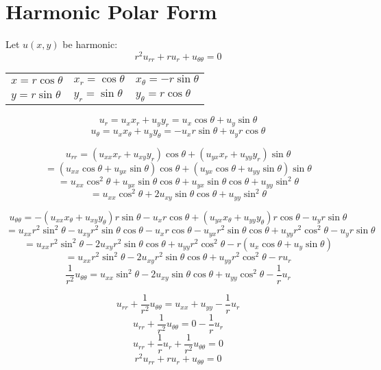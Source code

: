 \documentclass[letterpaper,12pt,fleqn]{article}
\renewcommand{\o}{\theta}
\begin{document}
\section*{Harmonic Polar Form}

\begin{theorem}
  Let $u(x,y)$ be harmonic:
  \[r^2u_{rr}+ru_r+u_{\o\o}=0\]
\end{theorem}

\begin{theproof}
  \begin{tabular}{lll}
    $x=r\cos\o$ & $x_r=\cos\o$ & $x_{\o}=-r\sin\o$ \\
    $y=r\sin\o$ & $y_r=\sin\o$ & $y_{\o}=r\cos\o$ \\
  \end{tabular}
  \[u_r=u_xx_r+u_yy_r=u_x\cos\o+u_y\sin\o\]
  \[u_{\o}=u_xx_{\o}+u_yy_{\o}=-u_xr\sin\o+u_yr\cos\o\]

  \[u_{rr}=(u_{xx}x_r+u_{xy}y_r)\cos\o+(u_{yx}x_r+u_{yy}y_r)\sin\o\]
  \[=(u_{xx}\cos\o+u_{yx}\sin\o)\cos\o+(u_{yx}\cos\o+u_{yy}\sin\o)\sin\o\]
  \[=u_{xx}\cos^2\o+u_{yx}\sin\o\cos\o+u_{yx}\sin\o\cos\o+u_{yy}\sin^2\o\]
  \[=u_{xx}\cos^2\o+2u_{xy}\sin\o\cos\o+u_{yy}\sin^2\o\]

  \[u_{\o\o}=-(u_{xx}x_{\o}+u_{xy}y_{\o})r\sin\o-u_xr\cos\o+
  (u_{yx}x_{\o}+u_{yy}y_{\o})r\cos\o-u_yr\sin\o\]
  \[=u_{xx}r^2\sin^2\o-u_{xy}r^2\sin\o\cos\o-u_xr\cos\o-
  u_{yx}r^2\sin\o\cos\o+u_{yy}r^2\cos^2\o-u_yr\sin\o\]
  \[=u_{xx}r^2\sin^2\o-2u_{xy}r^2\sin\o\cos\o+u_{yy}r^2\cos^2\o-
  r(u_x\cos\o+u_y\sin\o)\]
  \[=u_{xx}r^2\sin^2\o-2u_{xy}r^2\sin\o\cos\o+u_{yy}r^2\cos^2\o-ru_r\]
  \[\frac{1}{r^2}u_{\o\o}=u_{xx}\sin^2\o-2u_{xy}\sin\o\cos\o+u_{yy}\cos^2\o-
  \frac{1}{r}u_r\]

  \[u_{rr}+\frac{1}{r^2}u_{\o\o}=u_{xx}+u_{yy}-\frac{1}{r}u_r\]
  \[u_{rr}+\frac{1}{r^2}u_{\o\o}=0-\frac{1}{r}u_r\]
  \[u_{rr}+\frac{1}{r}u_r+\frac{1}{r^2}u_{\o\o}=0\]
  \[r^2u_{rr}+ru_r+u_{\o\o}=0\]
\end{theproof}
\end{document}
